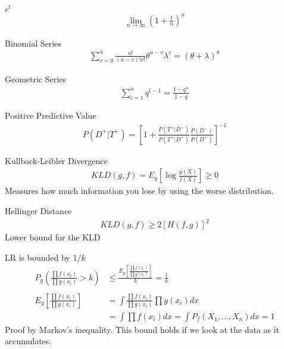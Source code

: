 \documentclass[avery5388,grid,frame]{flashcards}
\begin{document}
\begin{flashcard}{$e^t$}
\bigskip\bigskip\bigskip
{\begin{align*}
\lim_{n\rightarrow\infty}\left(1+\frac{t}{n}\right)^n
\end{align*}}
\end{flashcard}
\begin{flashcard}{Binomial Series}
\bigskip\bigskip\bigskip
{\begin{align*}
\sum_{v=0}^u\frac{u!}{(u-v)!v!}\theta^{u-v}\lambda^v=(\theta+\lambda)^u
\end{align*}}
\end{flashcard}
\begin{flashcard}{Geometric Series}
\bigskip\bigskip\bigskip
{\begin{align*}
\sum_{i=1}^nq^{i-1}=\frac{1-q^n}{1-q}
\end{align*}}
\end{flashcard}
 \begin{flashcard}[Definition]{Positive Predictive Value}
\bigskip\bigskip\bigskip
{\begin{align*}
P(D^+|T^+)=\left[1+\frac{P(T^+|D^-)}{P(T^+|D^+)}\frac{P(D^-)}{P(D^+)}\right]^{-1}
\end{align*}}
\end{flashcard}
 \begin{flashcard}[Definition]{Kullback-Leibler Divergence}
\bigskip\bigskip\bigskip
{\begin{align*}
KLD(g,f)=E_g\left[\log\frac{g(X)}{f(X)}\right]\geq0
\end{align*}}
Measures how much information you lose by using the worse distribution.
\end{flashcard}
 \begin{flashcard}[Definition]{Hellinger Distance}
\bigskip\bigskip\bigskip
{\begin{align*}
KLD(g,f)\geq2[H(f,g)]^2
\end{align*}}
Lower bound for the KLD
\end{flashcard}
 \begin{flashcard}[Proof]{LR is bounded by $1/k$}
\bigskip\bigskip\bigskip
{\begin{align*}
P_g\left(\frac{\prod f(x_i)}{\prod g(x_i)}>k\right)&\leq\frac{E_g\left[\frac{\prod f(x_i)}{\prod g(x_i)}\right]}{k}=\frac{1}{k}\\\\
E_g\left[\frac{\prod f(x_i)}{\prod g(x_i)}\right]&=\int \frac{\prod f(x_i)}{\prod g(x_i)}\prod g(x_i)dx\\
&=\int\prod f(x_i)dx=\int P_f(X_1,...,X_n)dx=1
\end{align*}}
Proof by Markov's inequality. This bound holds if we look at the data as it accumulates.
\end{flashcard}
\end{document}
